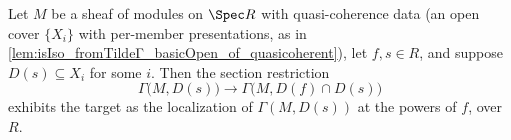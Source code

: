 \begin{lemma}
  \label{lem:section_localization_hfr_basicOpen}
  \leanok
  Let \(M\) be a sheaf of modules on \(\Spec R\) with quasi-coherence data (an open cover
  \(\{X_i\}\) with per-member presentations, as in
  \cref{lem:isIso_fromTildeΓ_basicOpen_of_quasicoherent}), let \(f, s \in R\), and
  suppose \(D(s) \subseteq X_i\) for some \(i\). Then the section restriction
  \[
    \Gamma\bigl(M, D(s)\bigr) \longrightarrow \Gamma\bigl(M, D(f) \cap D(s)\bigr)
  \]
  exhibits the target as the localization of \(\Gamma(M, D(s))\) at the powers of \(f\),
  over \(R\).
\end{lemma}
